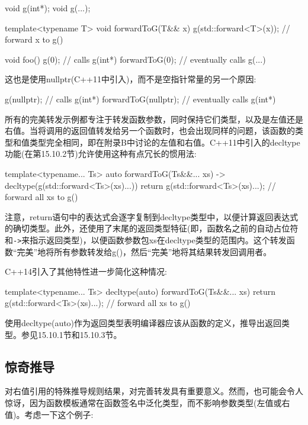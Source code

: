 \begin{cpp}
void g(int*);
void g(...);

template<typename T> void forwardToG(T&& x)
{
	g(std::forward<T>(x)); // forward x to g()
}

void foo()
{
	g(0); // calls g(int*)
	forwardToG(0); // eventually calls g(...)
}
\end{cpp}

这也是使用nullptr(C++11中引入)，而不是空指针常量的另一个原因:

\begin{cpp}
g(nullptr); // calls g(int*)
forwardToG(nullptr); // eventually calls g(int*)
\end{cpp}

所有的完美转发示例都专注于转发函数参数，同时保持它们类型，以及是左值还是右值。当将调用的返回值转发给另一个函数时，也会出现同样的问题，该函数的类型和值类型完全相同，即在附录B中讨论的左值和右值。C++11中引入的decltype功能(在第15.10.2节)允许使用这种有点冗长的惯用法:

\begin{cpp}
template<typename... Ts>
auto forwardToG(Ts&&... xs) -> decltype(g(std::forward<Ts>(xs)...))
{
	return g(std::forward<Ts>(xs)...); // forward all xs to g()
}
\end{cpp}

注意，return语句中的表达式会逐字复制到decltype类型中，以便计算返回表达式的确切类型。此外，还使用了末尾的返回类型特征(即，函数名之前的自动占位符和\texttt{->}来指示返回类型)，以便函数参数包xs在decltype类型的范围内。这个转发函数“完美”地将所有参数转发给g()，然后“完美”地将其结果转发回调用者。

C++14引入了其他特性进一步简化这种情况:

\begin{cpp}
template<typename... Ts>
decltype(auto) forwardToG(Ts&&... xs)
{
	return g(std::forward<Ts>(xs)...); // forward all xs to g()
}
\end{cpp}

使用decltype(auto)作为返回类型表明编译器应该从函数的定义，推导出返回类型。参见15.10.1节和15.10.3节。

\subsection{惊奇推导}

对右值引用的特殊推导规则结果，对完善转发具有重要意义。然而，也可能会令人惊讶，因为函数模板通常在函数签名中泛化类型，而不影响参数类型(左值或右值)。考虑一下这个例子:

